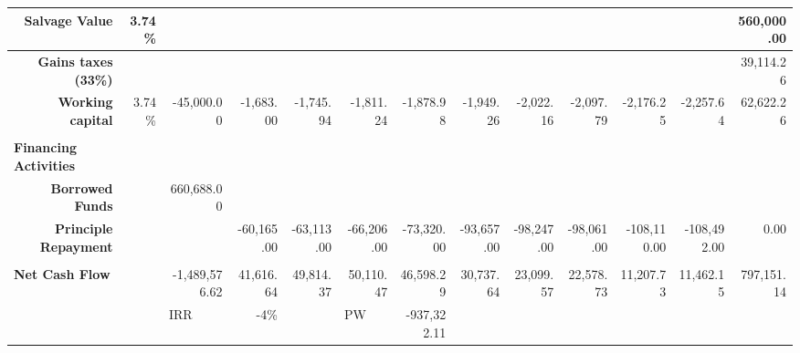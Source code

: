 \documentclass[12pt]{article}
\begin{document}
\begin{landscape}
\begin{table}[htbp]
\begin{tabular}{|r|r|l|r|r|l|r|r|r|r|r|r|r|}
    \hline
    \textbf{              Salvage Value} & 3.74\% &       &       &       &       &       &       &       &       &       &       & 560,000.00 \\
    \hline
    \textbf{              Gains taxes (33\%)} &       &       &       &       &       &       &       &       &       &       &       & 39,114.26 \\
    \hline
    \textbf{              Working capital} & 3.74\% & \multicolumn{1}{r|}{\textcolor[rgb]{ 1,  0,  0}{-45,000.00}} & \textcolor[rgb]{ 1,  0,  0}{-1,683.00} & \textcolor[rgb]{ 1,  0,  0}{-1,745.94} & \multicolumn{1}{r|}{\textcolor[rgb]{ 1,  0,  0}{-1,811.24}} & \textcolor[rgb]{ 1,  0,  0}{-1,878.98} & \textcolor[rgb]{ 1,  0,  0}{-1,949.26} & \textcolor[rgb]{ 1,  0,  0}{-2,022.16} & \textcolor[rgb]{ 1,  0,  0}{-2,097.79} & \textcolor[rgb]{ 1,  0,  0}{-2,176.25} & \textcolor[rgb]{ 1,  0,  0}{-2,257.64} & 62,622.26 \\
    \hline
          &       &       &       &       &       &       &       &       &       &       &       &  \\
    \hline
    \multicolumn{1}{|l|}{\textbf{Financing Activities}} &       &       &       &       &       &       &       &       &       &       &       &  \\
    \hline
    \textbf{               Borrowed Funds} &       & \multicolumn{1}{r|}{660,688.00} &       &       &       &       &       &       &       &       &       &  \\
    \hline
    \textbf{               Principle Repayment} &       &       & \textcolor[rgb]{ 1,  0,  0}{-60,165.00} & \textcolor[rgb]{ 1,  0,  0}{-63,113.00} & \multicolumn{1}{r|}{\textcolor[rgb]{ 1,  0,  0}{-66,206.00}} & \textcolor[rgb]{ 1,  0,  0}{-73,320.00} & \textcolor[rgb]{ 1,  0,  0}{-93,657.00} & \textcolor[rgb]{ 1,  0,  0}{-98,247.00} & \textcolor[rgb]{ 1,  0,  0}{-98,061.00} & \textcolor[rgb]{ 1,  0,  0}{-108,110.00} & \textcolor[rgb]{ 1,  0,  0}{-108,492.00} & 0.00 \\
    \hline
          &       &       &       &       &       &       &       &       &       &       &       &  \\
    \hline
    \multicolumn{1}{|l|}{\textbf{Net Cash Flow}} &       & \multicolumn{1}{r|}{\textcolor[rgb]{ 1,  0,  0}{-1,489,576.62}} & 41,616.64 & 49,814.37 & \multicolumn{1}{r|}{50,110.47} & 46,598.29 & 30,737.64 & 23,099.57 & 22,578.73 & 11,207.73 & 11,462.15 & 797,151.14 \\
    \hline
          &       & IRR   & -4\%  &       & PW    & \textcolor[rgb]{ 1,  0,  0}{-937,322.11} &       &       &       &       &       &  \\
    \bottomrule
    \end{tabular}%
  \label{tab:addlabel}%
\end{table}%

\end{landscape}
\end{document}
